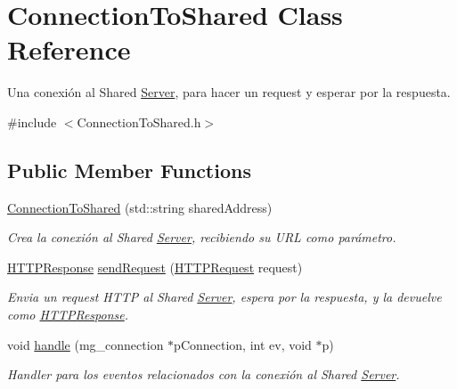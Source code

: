 \hypertarget{class_connection_to_shared}{}\section{Connection\+To\+Shared Class Reference}
\label{class_connection_to_shared}


Una conexión al Shared \hyperlink{class_server}{Server}, para hacer un request y esperar por la respuesta.  




{\ttfamily \#include $<$Connection\+To\+Shared.\+h$>$}

\subsection*{Public Member Functions}
\begin{DoxyCompactItemize}
\item 
\hyperlink{class_connection_to_shared_a4dfe5a7bd4837a5d3f016c253f7c506a}{Connection\+To\+Shared} (std\+::string shared\+Address)
\begin{DoxyCompactList}\small\item\em Crea la conexión al Shared \hyperlink{class_server}{Server}, recibiendo su U\+R\+L como parámetro. \end{DoxyCompactList}\item 
\hyperlink{class_h_t_t_p_response}{H\+T\+T\+P\+Response} \hyperlink{class_connection_to_shared_a8850352af79ff3ad0f27736f73536857}{send\+Request} (\hyperlink{class_h_t_t_p_request}{H\+T\+T\+P\+Request} request)
\begin{DoxyCompactList}\small\item\em Envia un request H\+T\+T\+P al Shared \hyperlink{class_server}{Server}, espera por la respuesta, y la devuelve como \hyperlink{class_h_t_t_p_response}{H\+T\+T\+P\+Response}. \end{DoxyCompactList}\item 
void \hyperlink{class_connection_to_shared_a24e08608ac219d2bac62e47b90bbc1d7}{handle} (mg\+\_\+connection $\ast$p\+Connection, int ev, void $\ast$p)
\begin{DoxyCompactList}\small\item\em Handler para los eventos relacionados con la conexión al Shared \hyperlink{class_server}{Server}. \end{DoxyCompactList}\end{DoxyCompactItemize}
